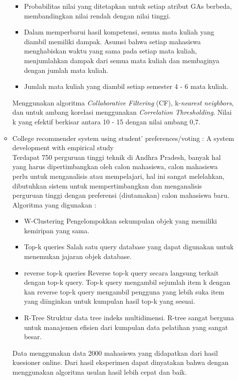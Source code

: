 \documentclass[a4paper,twoside]{article}
\begin{document}
\begin{enumerate}
\begin{itemize}
\begin{itemize}
				\item Probabilitas nilai yang ditetapkan untuk setiap atribut GAs berbeda, membandingkan nilai rendah dengan nilai tinggi.
				\item Dalam memperbarui hasil kompetensi, semua mata kuliah yang diambil memiliki dampak. Asumsi bahwa setiap mahasiswa menghabiskan waktu yang sama pada setiap mata kuliah, menjumlahkan dampak dari semua mata kuliah dan membaginya dengan jumlah mata kuliah. 
				\item Jumlah mata kuliah yang diambil setiap semester 4 - 6 mata kuliah.  
				\end{itemize}
				Menggunakan algoritma \textit{Collaborative Filtering} (CF), k-\textit{nearest neighbors}, dan untuk ambang korelasi menggunakan \textit{Correlation Thresholding}. Nilai k yang efektif berkisar antara 10 - 15 dengan nilai ambang 0,7. 
			
			\item College recommender system using student’ preferences/voting : A system development with empirical study\\
				Terdapat 750 perguruan tinggi teknik di Andhra Pradesh, banyak hal yang harus dipertimbangkan oleh calon mahasiswa, calon mahasiswa perlu untuk menganalisis atau mempelajari, hal ini sangat melelahkan, dibutuhkan sistem untuk mempertimbangkan dan menganalisis perguruan tinggi dengan preferensi (diutamakan) calon mahasiswa baru.\\
				Algoritma yang digunakan :
				\begin{itemize}
					\item W-Clustering
						Pengelompokkan sekumpulan objek yang memiliki kemiripan yang sama.
					\item Top-k queries
						Salah satu query database yang dapat digunakan untuk menemukan jajaran objek database.
					\item reverse top-k queries
						Reverse top-k query secara langsung terkait dengan top-k query. Top-k query mengambil sejumlah item k dengan kan reverse top-k query mengambil pengguna yang lebih suka item yang diinginkan untuk kumpulan hasil top-k yang sesuai.
					\item R-Tree
						Struktur data tree indeks multidimensi. R-tree sangat berguna untuk manajemen efisien dari kumpulan data pelatihan yang sangat besar. 
				\end{itemize}
		Data menggunakan data 2000 mahasiswa yang didapatkan dari hasil kuesioner online. Dari hasil eksperimen dapat dinyatakan bahwa dengan menggunakan algoritma usulan hasil lebih cepat dan baik.
		

\end{itemize}
\end{enumerate}
\end{document}
